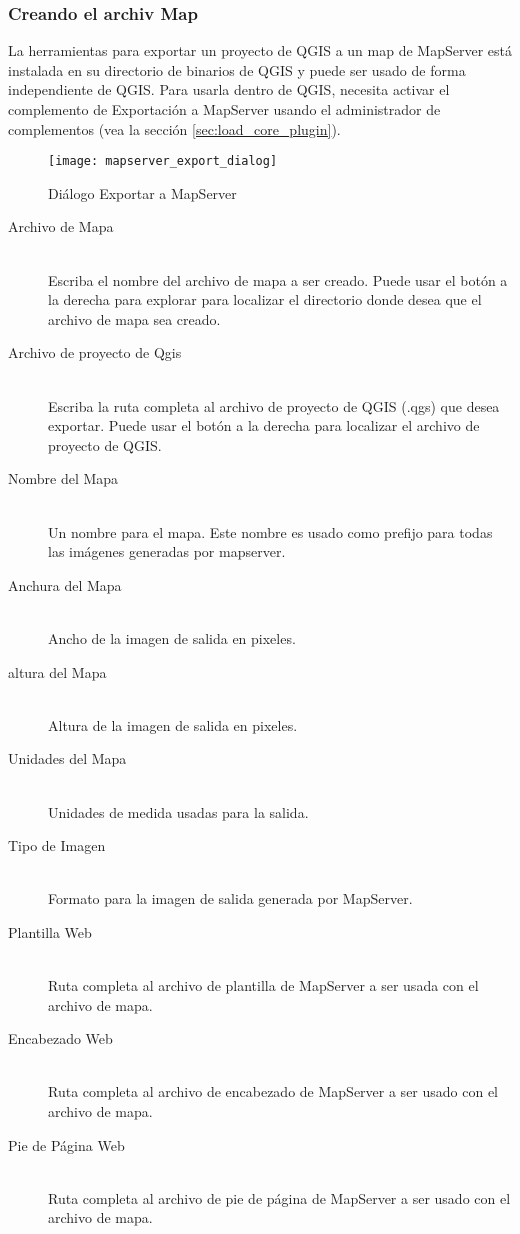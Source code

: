 \subsubsection{Creando el archiv Map}

La herramientas para exportar  un proyecto de QGIS a un map de MapServer 
está instalada en su directorio de binarios de QGIS y puede ser usado de forma independiente de QGIS. 
Para usarla dentro de QGIS, necesita activar el complemento de Exportación a MapServer usando el administrador de complementos (vea la sección \ref{sec:load_core_plugin}).

\begin{figure}[ht]
\begin{center}
  \caption{Diálogo Exportar a MapServer  \nixcaption}
  \label{fig:mapserver_export_dialog}\smallskip
  \texttt{[image: mapserver\_export\_dialog]}
\end{center}
\end{figure}

\begin{description}
\item [Archivo de Mapa] \mbox{}\\
Escriba el nombre del archivo de mapa a ser creado. Puede usar el botón a la derecha para explorar
para localizar el directorio donde desea que el archivo de mapa sea creado. 
\item [Archivo de proyecto de Qgis] \mbox{}\\
Escriba la ruta completa al archivo de proyecto de QGIS (.qgs) que desea exportar. Puede usar el botón 
a la derecha para localizar el archivo de proyecto de QGIS.
\item [Nombre del Mapa] \mbox{}\\
Un nombre para el mapa. Este nombre es usado como prefijo para todas las imágenes generadas por mapserver.
\item [Anchura del Mapa] \mbox{}\\
Ancho de la imagen de salida en pixeles.
\item [altura del Mapa] \mbox{}\\
Altura de la imagen de salida en pixeles.
\item [Unidades del Mapa] \mbox{}\\
Unidades de medida usadas para la salida.
\item [Tipo de Imagen] \mbox{}\\
Formato para la imagen de salida generada por MapServer.
\item [Plantilla Web] \mbox{}\\
Ruta completa al archivo de plantilla de MapServer a ser usada con el archivo de mapa.
\item [Encabezado Web] \mbox{}\\
Ruta completa al archivo de encabezado de MapServer a ser usado con el archivo de mapa.
\item [Pie de Página Web] \mbox{}\\
Ruta completa al archivo de pie de página de MapServer a ser usado con el archivo de mapa.
\end{description}

